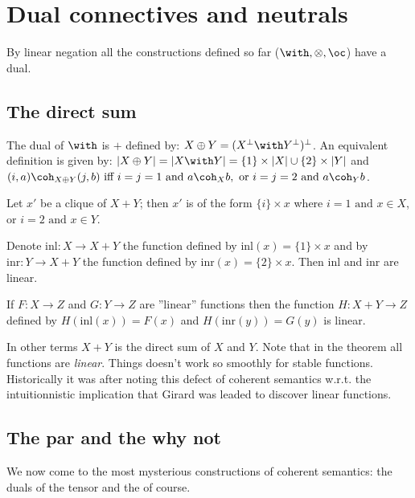 \section{Dual connectives and neutrals}\label{dual-connectives-and-neutrals}

By linear negation all the constructions defined so far
(\(\with, \tens, \oc\)) have a dual.

\subsection{The direct sum}\label{the-direct-sum}

The dual of \(\with\) is \(\plus\) defined by:
\(X\plus Y = (X\orth\with Y\orth)\orth\). An equivalent definition is
given by:
\(\web{X\plus Y} = \web{X\with Y} = \{1\}\times \web X \cup \{2\}\times\web Y\)
and
\((i, a)\coh_{X\plus Y} (j, b)\text{ iff } i = j = 1 \text{ and } a\coh_X b,\text{ or }i = j = 2\text{ and } a\coh_Y b\).

\begin{theorem}
Let $x'$ be a clique of $X\plus Y$; then $x'$ is of the form $\{i\}\times x$ where $i = 1\text{ and }x\in X$, or $i = 2\text{ and }x\in Y$.

Denote $\mathrm{inl}:X\longrightarrow X\plus Y$ the function defined by $\mathrm{inl}(x) = \{1\}\times x$ and by $\mathrm{inr}:Y\longrightarrow X\plus Y$ the function defined by $\mathrm{inr}(x) = \{2\}\times x$. Then $\mathrm{inl}$ and $\mathrm{inr}$ are linear.

If $F:X\longrightarrow Z$ and $G:Y\longrightarrow Z$ are ''linear'' functions then the function $H:X\plus Y \longrightarrow Z$ defined by $H(\mathrm{inl}(x)) = F(x)$ and $H(\mathrm{inr}(y)) = G(y)$ is linear.
\end{theorem}

In other terms \(X\plus Y\) is the direct sum of \(X\) and \(Y\). Note
that in the theorem all functions are \emph{linear}. Things doesn't work
so smoothly for stable functions. Historically it was after noting this
defect of coherent semantics w.r.t. the intuitionnistic implication that
Girard was leaded to discover linear functions.

\subsection{The par and the why not}\label{the-par-and-the-why-not}

We now come to the most mysterious constructions of coherent semantics:
the duals of the tensor and the of course.

